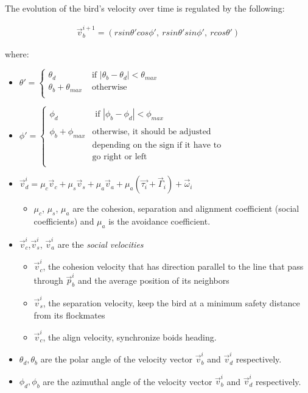 The evolution of the bird's  velocity over time is regulated by
the following:
%
%

\begin{align}
\label{eq:birdCumulativeVelocities}
\vec{v}_b^{i+1} = (r sin\theta' cos \phi', \ r sin\theta' sin \phi', \ r cos \theta')
\end{align}

where:
\begin{itemize}
	\item $
	\theta' = \begin{cases}
	\theta_d &\mbox{ if }  |\theta_b - \theta_d| < \theta_{max}\\
	\theta_b + \theta_{max} &\mbox{ otherwise }\\
	\end{cases}
	$ \hfill \\
	\medskip
	\item $
	\phi' = \begin{cases}
	\phi_d &\mbox{ if }  |\phi_b - \phi_d| < \phi_{max}\\
	\\
	\phi_b + \phi_{max} &\mbox{otherwise, it should be adjusted}\\
	
	&\mbox{depending on the sign if it have to}\\
	&\mbox{go right or left}\\
	\end{cases}
	$ \hfill \\ 
	
	
	\item $ \vec{v}_d^i = \mu_c \vec{v}_c + \mu_s\vec{v}_s + \mu_a \vec{v}_a + \mu_{a} \left(
	\vec{{\tau}_i} + \vec{\Gamma}_i \right) + \vec{\omega}_i $
	
	\begin{itemize}
		\item $\mu_c$, $\mu_s$, $\mu_a$ are the cohesion, separation and alignment coefficient (social coefficients) and $\mu_a$ is the avoidance coefficient. 
	\end{itemize}
	\item  $\vec{v}^i_c$,$\vec{v}^i_s$, $\vec{v}^i_a$ are the  \textit{social velocities} \cite{Hemelrijk:2011}
	\begin{itemize}
		\item $\vec{v}^i_c$, the cohesion velocity that has direction parallel to the
		line that pass through $\vec{p}_b^i$ and the average position of its neighbors
		\item $\vec{v}^i_s$, the separation velocity, keep the bird at a minimum
		safety distance from its flockmates
		\item  $\vec{v}^i_c$, the align velocity, synchronize boids heading.
	\end{itemize}
	\item $\theta_d,\theta_b$ are the polar angle of the velocity vector
	$\vec{v}^i_b$ and $\vec{v}^i_d$ respectively.
	\item $\phi_d,\phi_b$ are the azimuthal angle of the velocity vector
	$\vec{v}^i_b$ and $\vec{v}^i_d$ respectively.
	

\end{itemize}
